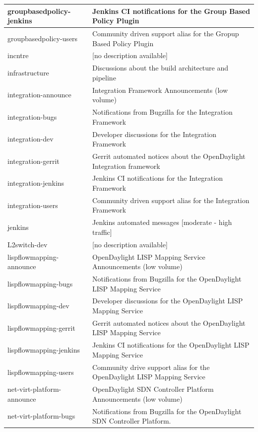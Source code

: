 \documentclass[a4paper, 12pt]{book}
\begin{document}
{\begin{longtable}{|p{4cm}|p{10cm}|}
groupbasedpolicy-jenkins &	Jenkins CI notifications for the Group Based Policy Plugin \\ \hline
groupbasedpolicy-users &	Community driven support alias for the Gropup Based Policy Plugin \\ \hline
incntre &	[no description available] \\ \hline
infrastructure &	Discussions about the build architecture and pipeline \\ \hline
integration-announce &	Integration Framework Announcements (low volume) \\ \hline
integration-bugs &	Notifications from Bugzilla for the Integration Framework \\ \hline
integration-dev &	Developer discussions for the Integration Framework \\ \hline
integration-gerrit &	Gerrit automated notices about the OpenDaylight Integration framework \\ \hline
integration-jenkins &	Jenkins CI notifications for the Integration Framework \\ \hline
integration-users &	Community driven support alias for the Integration Framework \\ \hline
jenkins &	Jenkins automated messages [moderate - high traffic] \\ \hline
L2switch-dev &	[no description available] \\ \hline
lispflowmapping-announce &	OpenDaylight LISP Mapping Service Announcements (low volume) \\ \hline
lispflowmapping-bugs &	Notifications from Bugzilla for the OpenDaylight LISP Mapping Service \\ \hline
lispflowmapping-dev &	Developer discussions for the OpenDaylight LISP Mapping Service \\ \hline
lispflowmapping-gerrit &	Gerrit automated notices about the OpenDaylight LISP Mapping Service \\ \hline
lispflowmapping-jenkins &	Jenkins CI notifications for the OpenDaylight LISP Mapping Service \\ \hline
lispflowmapping-users &	Community drive support alias for the OpenDaylight LISP Mapping Service \\ \hline
net-virt-platform-announce &	OpenDaylight SDN Controller Platform Announcements (low volume) \\ \hline
net-virt-platform-bugs &	Notifications from Bugzilla for the OpenDaylight SDN Controller Platform. \\ \hline

\end{longtable}}
\end{document}
